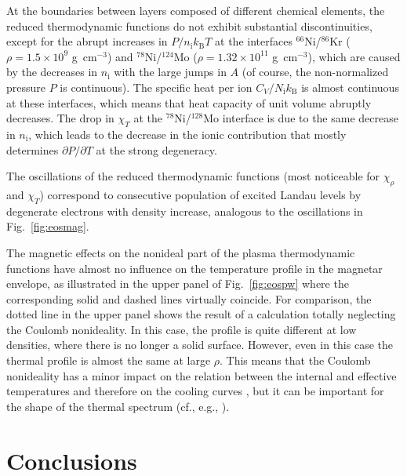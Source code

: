 \documentclass[traditabstract]{aa}
\newcommand{\gcc}{\mbox{g~cm$^{-3}$}}
\newcommand{\nion}{n_\mathrm{i}}
\newcommand{\Nion}{N_\mathrm{i}}
\newcommand{\kB}{k_\mathrm{B}}
\begin{document}
At the boundaries between layers composed of different
chemical elements, the reduced thermodynamic functions do
not exhibit substantial discontinuities, except for the
abrupt increases in $P/\nion\kB T$ at the interfaces
$^{66}$Ni/$^{86}$Kr ($\rho=1.5\times10^9$ \gcc) and
$^{78}$Ni/$^{124}$Mo ($\rho=1.32\times10^{11}$ \gcc), which
are caused by the decreases in $\nion$ with the large jumps
in $A$ (of course, the non-normalized pressure $P$ is
continuous). The specific heat per ion $C_V/\Nion\kB$ is
almost continuous at these interfaces, which means that heat
capacity of unit volume abruptly decreases. The drop in
$\chi_T$ at the $^{78}$Ni/$^{128}$Mo interface is due to the
same decrease in $\nion$, which leads to the decrease in the
ionic contribution that mostly determines $\partial
P/\partial T$ at the strong degeneracy.

The oscillations of the reduced thermodynamic functions
(most noticeable for $\chi_\rho$ and $\chi_T$) correspond to
consecutive population of excited Landau levels by
degenerate electrons with density increase, analogous to the
oscillations in Fig.~\ref{fig:eosmag}.

The magnetic effects on the nonideal part of the plasma
thermodynamic functions have almost no influence on the
temperature profile in the magnetar envelope, as illustrated
in the upper panel of Fig.~\ref{fig:eospw} where the
corresponding solid and dashed lines virtually coincide. For
comparison, the dotted line in the upper panel shows the result of a
calculation totally neglecting the Coulomb nonideality. In
this case, the profile is quite different at low densities,
where there is no longer a solid surface. However, even in
this case the thermal profile is almost the same at large
$\rho$. This means that the Coulomb nonideality has a minor
impact on the relation between the internal and
effective temperatures and therefore on the cooling curves
\citep{YakovlevPethick}, but it can be important for the
shape of the thermal spectrum (cf., e.g.,
\citealp{Potekhin-ea12}).

\section{Conclusions}
\label{sect:concl}
\end{document}
